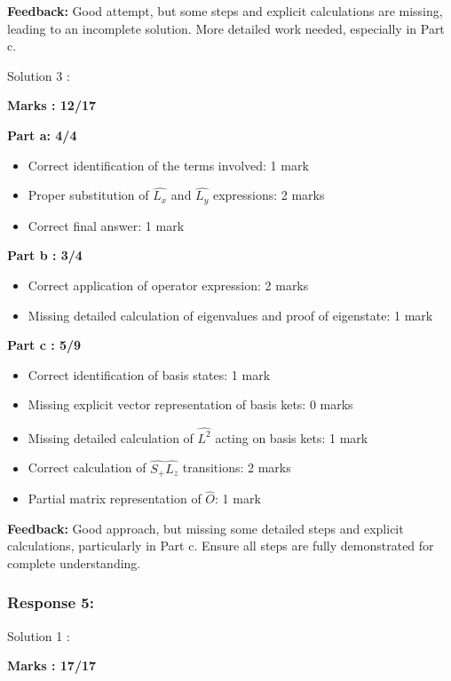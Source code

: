 \documentclass[a4paper,11pt]{article}
\begin{document}
\textbf{Feedback:}
Good attempt, but some steps and explicit calculations are missing, leading to an incomplete solution. More detailed work needed, especially in Part c.



Solution 3 :

\textbf{Marks : 12/17}

\textbf{Part a: 4/4}
\begin{itemize}
    \item Correct identification of the terms involved: 1 mark
    \item Proper substitution of $\hat{L_x}$ and $\hat{L_y}$ expressions: 2 marks
    \item Correct final answer: 1 mark
\end{itemize}



\textbf{Part b : 3/4}
\begin{itemize}
    \item Correct application of operator expression: 2 marks
    \item Missing detailed calculation of eigenvalues and proof of eigenstate: 1 mark
\end{itemize}



\textbf{Part c : 5/9}
\begin{itemize}
    \item Correct identification of basis states: 1 mark
    \item Missing explicit vector representation of basis kets: 0 marks
    \item Missing detailed calculation of $\hat{L^2}$ acting on basis kets: 1 mark
    \item Correct calculation of $\hat{S_+}\hat{L_z}$ transitions: 2 marks
    \item Partial matrix representation of $\hat{O}$: 1 mark
\end{itemize}

\textbf{Feedback:}
Good approach, but missing some detailed steps and explicit calculations, particularly in Part c. Ensure all steps are fully demonstrated for complete understanding.


\subsubsection*{Response 5:}

Solution 1 :

\textbf{Marks : 17/17}
\end{document}
